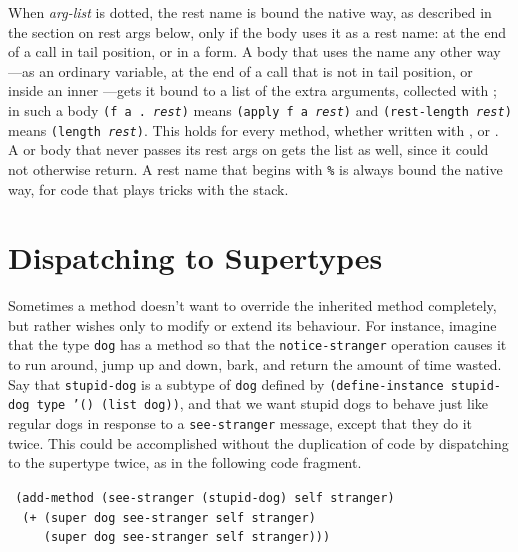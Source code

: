 

When \emph{arg-list} is dotted, the rest name is bound the native way,
as described in the section on rest args below, only if the body uses
it as a rest name: at the end of a call in tail position, or in a
 form.  A body that uses the name any other way---as an
ordinary variable, at the end of a call that is not in tail position,
or inside an inner ---gets it bound to a list of the extra
arguments, collected with ; in such a body
\texttt{(f a .\ \emph{rest})} means \texttt{(apply f a \emph{rest})}
and \texttt{(rest-length \emph{rest})} means \texttt{(length
\emph{rest})}.  This holds for every method, whether written with
,  or .  A  or
 body that never passes its rest args on gets the list as
well, since it could not otherwise return.  A rest name that begins
with \texttt{\%} is always bound the native way, for code that plays
tricks with the stack.


\section{Dispatching to Supertypes}

Sometimes a method doesn't want to override the inherited method
completely, but rather wishes only to modify or extend its
behaviour.  For instance, imagine that the type \texttt{dog} has a method
so that the \texttt{notice-stranger} operation causes it to run around,
jump up and down, bark, and return the amount of time wasted.  Say
that \texttt{stupid-dog} is a subtype of \texttt{dog} defined by
\texttt{(define-instance stupid-dog type '() (list dog))}, and that we
want stupid dogs to behave just like regular dogs in response to a
\texttt{see-stranger} message, except that they do it twice.  This could
be accomplished without the duplication of code by dispatching to the
supertype twice, as in the following code fragment.
\begin{flushleft}\tt
(add-method (see-stranger (stupid-dog) self stranger)\\
~~(+ ({\upar}super dog see-stranger self stranger)\\
~~~~~({\upar}super dog see-stranger self stranger)))
\end{flushleft}


